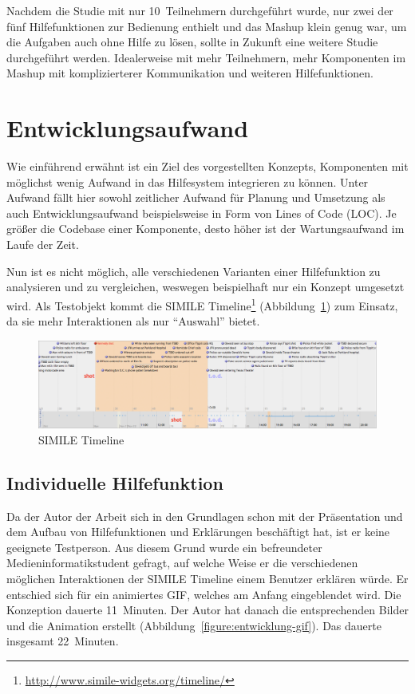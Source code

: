 \documentclass[
	headsepline,
	footsepline,
	fontsize=12pt,
	bibliography=totoc
]{scrbook}
\begin{document}
Nachdem die Studie mit nur 10~Teilnehmern durchgeführt wurde, nur zwei der fünf Hilfefunktionen zur Bedienung enthielt und das Mashup klein genug war, um die Aufgaben auch ohne Hilfe zu lösen, sollte in Zukunft eine weitere Studie durchgeführt werden. Idealerweise mit mehr Teilnehmern, mehr Komponenten im Mashup mit komplizierterer Kommunikation und weiteren Hilfefunktionen.

\section{Entwicklungsaufwand}
\label{section:evaluation:entwicklungsaufwand}

Wie einführend erwähnt ist ein Ziel des vorgestellten Konzepts, Komponenten mit möglichst wenig Aufwand in das Hilfesystem integrieren zu können. Unter Aufwand fällt hier sowohl zeitlicher Aufwand für Planung und Umsetzung als auch Entwicklungsaufwand beispielsweise in Form von Lines of Code (LOC). Je größer die Codebase einer Komponente, desto höher ist der Wartungsaufwand im Laufe der Zeit.

Nun ist es nicht möglich, alle verschiedenen Varianten einer Hilfefunktion zu analysieren und zu vergleichen, weswegen beispielhaft nur ein Konzept umgesetzt wird. Als Testobjekt kommt die SIMILE Timeline\footnote{\url{http://www.simile-widgets.org/timeline/}} (Abbildung~\ref{figure:simile-timeline}) zum Einsatz, da sie mehr Interaktionen als nur \enquote{Auswahl} bietet.

\begin{figure}[htbp]
   \centering
   \includegraphics[width=\textwidth]{images/evaluation-simile-timeline.png}
   \caption{SIMILE Timeline}
   \label{figure:simile-timeline}
\end{figure}

\subsection{Individuelle Hilfefunktion}
\label{section:evaluation:entwicklungsaufwand:eigeneskonzept}

Da der Autor der Arbeit sich in den Grundlagen schon mit der Präsentation und dem Aufbau von Hilfefunktionen und Erklärungen beschäftigt hat, ist er keine geeignete Testperson. Aus diesem Grund wurde ein befreundeter Medieninformatikstudent gefragt, auf welche Weise er die verschiedenen möglichen Interaktionen der SIMILE Timeline einem Benutzer erklären würde. Er entschied sich für ein animiertes GIF, welches am Anfang eingeblendet wird. Die Konzeption dauerte 11~Minuten. Der Autor hat danach die entsprechenden Bilder und die Animation erstellt (Abbildung~\ref{figure:entwicklung-gif}). Das dauerte insgesamt 22~Minuten.
\end{document}
